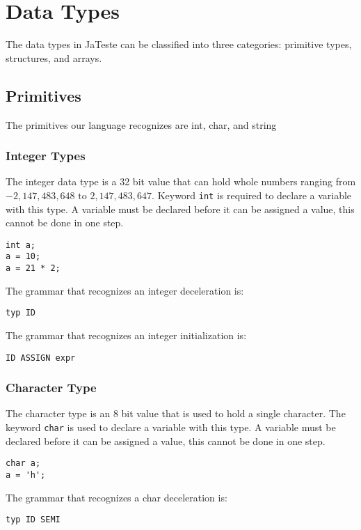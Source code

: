 \documentclass{article}
\begin{document}
\section{Data Types}
The data types in JaTeste can be classified into three categories: primitive types, structures, and arrays.

\subsection{Primitives}
The primitives our language recognizes are int, char, and string

\subsubsection{Integer Types}
The integer data type is a 32 bit value that can hold whole numbers ranging from $-2,147,483,648 \text{ to } 2,147,483,647$. Keyword \texttt{int} is required to declare a variable with this type.  A variable must be declared before it can be assigned a value, this cannot be done in one step.

\begin{lstlisting}
int a;
a = 10;
a = 21 * 2;
\end{lstlisting}

The grammar that recognizes an integer deceleration is: 
\begin{Verbatim}[frame=single]
typ ID
\end{Verbatim}

The grammar that recognizes an integer initialization is: 
\begin{Verbatim}[frame=single]
ID ASSIGN expr
\end{Verbatim}

\subsubsection{Character Type}
The character type is an 8 bit value that is used to hold a single character. The keyword \texttt{char} is used to declare a variable with this type.  A variable must be declared before it can be assigned a value, this cannot be done in one step.
\begin{lstlisting}
char a;
a = 'h';
\end{lstlisting}

The grammar that recognizes a char deceleration is: 
\begin{Verbatim}[frame=single]
typ ID SEMI
\end{Verbatim}
\end{document}
